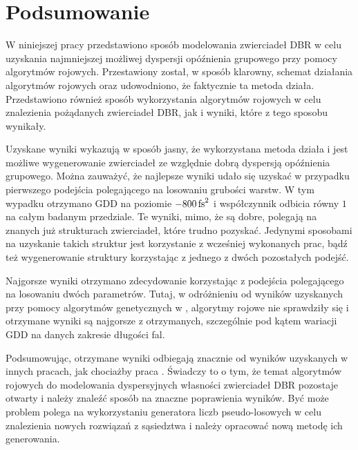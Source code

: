 \chapter{Podsumowanie} %

W niniejszej pracy przedstawiono sposób modelowania zwierciadeł DBR w celu uzyskania najmniejszej możliwej dyspersji opóźnienia grupowego przy pomocy algorytmów rojowych. Przestawiony został, w sposób klarowny, schemat działania algorytmów rojowych oraz udowodniono, że faktycznie ta metoda działa. Przedstawiono również sposób wykorzystania algorytmów rojowych w celu znalezienia pożądanych zwierciadeł DBR, jak i wyniki, które z tego sposobu wynikały.

Uzyskane wyniki wykazują w sposób jasny, że wykorzystana metoda działa i jest możliwe wygenerowanie zwierciadeł ze względnie dobrą dyspersją opóźnienia grupowego. Można zauważyć, że najlepsze wyniki udało się uzyskać w przypadku pierwszego podejścia polegającego na losowaniu grubości warstw. W tym wypadku otrzymano GDD na poziomie $-800\,\mathrm{fs}^2$ i współczynnik odbicia równy $1$ na całym badanym przedziale. Te wyniki, mimo, że są dobre, polegają na znanych już strukturach zwierciadeł, które trudno pozyskać. Jedynymi sposobami na uzyskanie takich struktur jest korzystanie z wcześniej wykonanych prac, bądź też wygenerowanie struktury korzystając z jednego z dwóch pozostałych podejść.

Najgorsze wyniki otrzymano zdecydowanie korzystając z podejścia polegającego na losowaniu dwóch parametrów. Tutaj, w odróżnieniu od wyników uzyskanych przy pomocy algorytmów genetycznych w \cite{dbr2}, algorytmy rojowe nie sprawdziły się i otrzymane wyniki są najgorsze z otrzymanych, szczególnie pod kątem wariacji GDD na danych zakresie długości fal.

Podsumowując, otrzymane wyniki odbiegają znacznie od wyników uzyskanych w innych pracach, jak chociażby praca \cite{dbr2}. Świadczy to o tym, że temat algorytmów rojowych do modelowania dyspersyjnych własności zwierciadeł DBR pozostaje otwarty i należy znaleźć sposób na znaczne poprawienia wyników. Być może problem polega na wykorzystaniu generatora liczb pseudo-losowych w celu znalezienia nowych rozwiązań z sąsiedztwa i należy opracować nową metodę ich generowania.  
